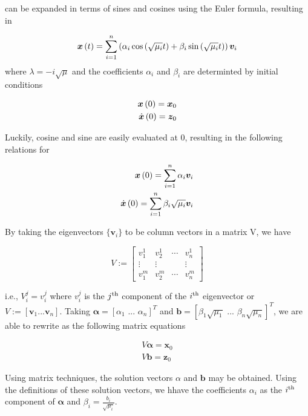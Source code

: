 \documentclass[10pt,a4paper]{article}
\renewcommand{\vec}[1]{\boldsymbol{#1}}
\begin{document}
\begin{multicols*}{2}
 can be expanded in terms of sines and cosines using the Euler formula, resulting in

\begin{equation}
	\vec{x}\paren{t} = \sum\limits_{i=1}^n \paren{\alpha_i \cos{\paren{\sqrt{\mu_i} t}} + \beta_i \sin{\paren{\sqrt{\mu_i} t}}} \vec{v}_i
\end{equation}
where $\lambda = -i\sqrt{\mu}$ and the coefficients $\alpha_i$ and $\beta_i$ are determinted by initial conditions

\begin{subequations}
	\begin{align}
		\vec{x} \paren{0} = \vec{x}_0 \label{eqn: xic} \\
		\dot{\vec{x}} \paren{0} = \vec{z}_0 \label{eqn: derivative ic}
	\end{align}
\end{subequations}

Luckily, cosine and sine are easily evaluated at 0, resulting in the following relations for 

\begin{subequations}
	\begin{align}
		\vec{x}\paren{0} = \sum\limits_{i=1}^n \alpha_i \vec{v}_i \label{eqn: alphaeq} \\
		\dot{\vec{x}}\paren{0} = \sum\limits_{i=1}^n \beta_i \sqrt{\mu_i} \vec{v}_i \label{eqn: betaeq}
	\end{align}
\end{subequations}

By taking the eigenvectors $\{ \vec{v}_i\}$ to be column vectors in a matrix V, we have

$$
V := 
\begin{bmatrix}
	v_1^1 & v_2^1 & \cdots & v_n^1 \\
	\vdots & \vdots & & \vdots \\
	v_1^m & v_2^m & \cdots & v_n^m
\end{bmatrix}
$$

i.e., $V_i^j = v_i^j$ where $v_i^j$ is the $j^{\rm{th}}$ component of the $i^{\rm{th}}$ eigenvector or $V := [ \vec{v}_1 ... \vec{v}_n ]$. Taking $\vec{\alpha} = \left[ \alpha_1 \,\,...\,\, \alpha_n \right]^T$ and $\vec{b} = \left[ \beta_1 \sqrt{\mu_1} \,\,...\,\, \beta_n \sqrt{\mu_n} \right]^T$, we are able to rewrite  as the following matrix equations

\begin{subequations}
	\begin{align}
		V \vec{\alpha} = \vec{x}_0 \label{eqn: amat} \\
		V \vec{b} = \vec{z}_0 \label{eqn: bmat}
	\end{align}
\end{subequations}

Using matrix techniques, the solution vectors $\alpha$ and $\vec{b}$ may be obtained. Using the definitions of these solution vectors, we hhave the coefficients $\alpha_i$ as the $i^{\rm{th}}$ component of $\vec{\alpha}$ and $\beta_i = \frac{b_i}{\sqrt{\mu_i}}$.
\end{multicols*}
\end{document}
